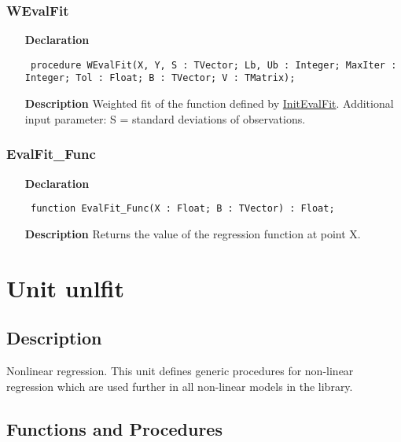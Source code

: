 \documentclass[12pt,a4paper,oneside]{report}
\newcommand{\declarationitem}[1]{\textbf{#1}}
\newcommand{\descriptiontitle}[1]{\textbf{#1}}
\newcommand{\code}[1]{\texttt{#1}}
\begin{document}
\subsubsection{WEvalFit}
\label{uevalfit-WEvalFit}
\begin{itemize}\item[\declarationitem{Declaration}\hfill]
	\begin{flushleft}
		\code{
			procedure WEvalFit(X, Y, S : TVector; Lb, Ub : Integer; MaxIter : Integer; Tol : Float; B : TVector; V : TMatrix);}
		
	\end{flushleft}
	
	\par
	\item[\descriptiontitle{Description}]
	Weighted fit of the function defined by \hyperref[uevalfit-InitEvalFit]{InitEvalFit}.	
	Additional input parameter: S = standard deviations of observations.
	
\end{itemize}
\subsubsection{EvalFit{\_}Func}
\label{uevalfit-EvalFit_Func}
\begin{itemize}\item[\declarationitem{Declaration}\hfill]
	\begin{flushleft}
		\code{
			function EvalFit{\_}Func(X : Float; B : TVector) : Float;}
		
	\end{flushleft}
	
	\par
	\item[\descriptiontitle{Description}]
	Returns the value of the regression function at point X.
\end{itemize}

\section{Unit unlfit}
\label{unlfit}
\subsection{Description}
Nonlinear regression. This unit defines generic procedures for non-linear regression which are used further in all non-linear models in the library. 
\subsection{Functions and Procedures}
\end{document}
